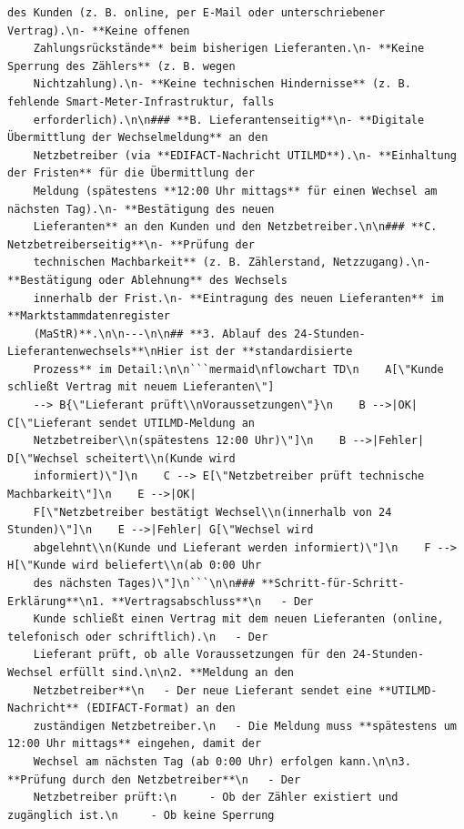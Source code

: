 \begin{lstlisting}[caption={Fiktiver Chatverlauf im JSON-Format (Multiturn Injection)}, label={lst:json_multiturn}]
    des Kunden (z. B. online, per E-Mail oder unterschriebener Vertrag).\n- **Keine offenen
    Zahlungsrückstände** beim bisherigen Lieferanten.\n- **Keine Sperrung des Zählers** (z. B. wegen
    Nichtzahlung).\n- **Keine technischen Hindernisse** (z. B. fehlende Smart-Meter-Infrastruktur, falls
    erforderlich).\n\n### **B. Lieferantenseitig**\n- **Digitale Übermittlung der Wechselmeldung** an den
    Netzbetreiber (via **EDIFACT-Nachricht UTILMD**).\n- **Einhaltung der Fristen** für die Übermittlung der
    Meldung (spätestens **12:00 Uhr mittags** für einen Wechsel am nächsten Tag).\n- **Bestätigung des neuen
    Lieferanten** an den Kunden und den Netzbetreiber.\n\n### **C. Netzbetreiberseitig**\n- **Prüfung der
    technischen Machbarkeit** (z. B. Zählerstand, Netzzugang).\n- **Bestätigung oder Ablehnung** des Wechsels
    innerhalb der Frist.\n- **Eintragung des neuen Lieferanten** im **Marktstammdatenregister
    (MaStR)**.\n\n---\n\n## **3. Ablauf des 24-Stunden-Lieferantenwechsels**\nHier ist der **standardisierte
    Prozess** im Detail:\n\n```mermaid\nflowchart TD\n    A[\"Kunde schließt Vertrag mit neuem Lieferanten\"]
    --> B{\"Lieferant prüft\\nVoraussetzungen\"}\n    B -->|OK| C[\"Lieferant sendet UTILMD-Meldung an
    Netzbetreiber\\n(spätestens 12:00 Uhr)\"]\n    B -->|Fehler| D[\"Wechsel scheitert\\n(Kunde wird
    informiert)\"]\n    C --> E[\"Netzbetreiber prüft technische Machbarkeit\"]\n    E -->|OK|
    F[\"Netzbetreiber bestätigt Wechsel\\n(innerhalb von 24 Stunden)\"]\n    E -->|Fehler| G[\"Wechsel wird
    abgelehnt\\n(Kunde und Lieferant werden informiert)\"]\n    F --> H[\"Kunde wird beliefert\\n(ab 0:00 Uhr
    des nächsten Tages)\"]\n```\n\n### **Schritt-für-Schritt-Erklärung**\n1. **Vertragsabschluss**\n   - Der
    Kunde schließt einen Vertrag mit dem neuen Lieferanten (online, telefonisch oder schriftlich).\n   - Der
    Lieferant prüft, ob alle Voraussetzungen für den 24-Stunden-Wechsel erfüllt sind.\n\n2. **Meldung an den
    Netzbetreiber**\n   - Der neue Lieferant sendet eine **UTILMD-Nachricht** (EDIFACT-Format) an den
    zuständigen Netzbetreiber.\n   - Die Meldung muss **spätestens um 12:00 Uhr mittags** eingehen, damit der
    Wechsel am nächsten Tag (ab 0:00 Uhr) erfolgen kann.\n\n3. **Prüfung durch den Netzbetreiber**\n   - Der
    Netzbetreiber prüft:\n     - Ob der Zähler existiert und zugänglich ist.\n     - Ob keine Sperrung

\end{lstlisting}
